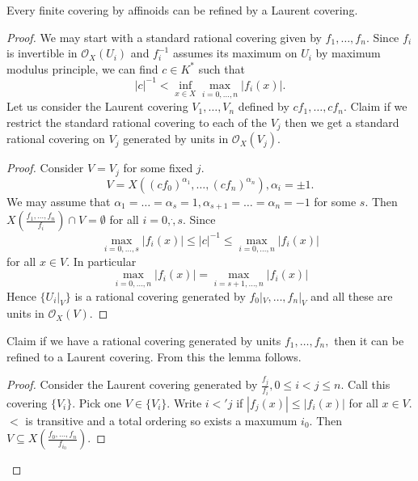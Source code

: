 \documentclass[a4paper]{article}
\renewcommand*{\O}{\mathcal{O}}
\begin{document}
\begin{lemma}
  Every finite covering by affinoids can be refined by a Laurent covering.
\end{lemma}

\begin{proof}
  We may start with a standard rational covering given by \(f_1, \dots, f_n\). Since \(f_i\) is invertible in \(\O_X(U_i)\) and \(f_i^{-1}\) assumes its maximum on \(U_i\) by maximum modulus principle, we can find \(c \in K^*\) such that
  \[
    |c|^{-1} < \inf_{x \in X} \max_{i = 0, \dots, n} |f_i(x)|.
  \]
  Let us consider the Laurent covering \(V_1, \dots, V_n\) defined by \(cf_1, \dots, cf_n\). Claim if we restrict the standard rational covering to each of the \(V_j\) then we get a standard rational covering on \(V_j\) generated by units in \(\O_X(V_j)\).

  \begin{proof}
    Consider \(V = V_j\) for some fixed \(j\).
    \[
      V = X((cf_0)^{\alpha_1}, \dots, (cf_n)^{\alpha_n}), \alpha_i = \pm 1.
    \]
    We may assume that \(\alpha_1 = \dots = \alpha_s = 1, \alpha_{s + 1} = \dots = \alpha_n = -1\) for some \(s\). Then \(X(\frac{f_1, \dots, f_n}{f_i}) \cap V = \emptyset\) for all \(i = 0, \dot, s\). Since
    \[
      \max_{i = 0, \dots, s} |f_i(x)| \leq |c|^{-1} \leq \max_{i = 0, \dots, n} |f_i(x)|
    \]
    for all \(x \in V\). In particular
    \[
      \max_{i = 0, \dots, n} |f_i(x)| = \max_{i = s + 1, \dots, n} |f_i(x)|
    \]
    Hence \(\{U_i|_V\}\) is a rational covering generated by \(f_0|_V, \dots, f_n|_V\) and all these are units in \(\O_X(V)\).
  \end{proof}

  Claim if we have a rational covering generated by units \(f_1, \dots, f_n,\) then it can be refined to a Laurent covering. From this the lemma follows.

  \begin{proof}
    Consider the Laurent covering generated by \(\frac{f_j}{f_i}, 0 \leq i < j \leq n\). Call this covering \(\{V_i\}\). Pick one \(V \in \{V_i\}\). Write \(i <' j\) if \(|f_j(x)| \leq |f_i(x)|\) for all \(x \in V\). \(<\) is transitive and a total ordering so exists a maxumum \(i_0\). Then \(V \subseteq X(\frac{f_0, \dots, f_n}{f_{i_0}})\).
  \end{proof}
\end{proof}
\end{document}
